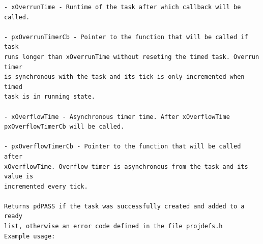 \begin{lstlisting}
- xOverrunTime - Runtime of the task after which callback will be called.

- pxOverrunTimerCb - Pointer to the function that will be called if task
runs longer than xOverrunTime without reseting the timed task. Overrun timer
is synchronous with the task and its tick is only incremented when timed
task is in running state.

- xOverflowTime - Asynchronous timer time. After xOverflowTime
pxOverflowTimerCb will be called.

- pxOverflowTimerCb - Pointer to the function that will be called after
xOverflowTime. Overflow timer is asynchronous from the task and its value is
incremented every tick.

Returns pdPASS if the task was successfully created and added to a ready
list, otherwise an error code defined in the file projdefs.h
Example usage:

\end{lstlisting}

